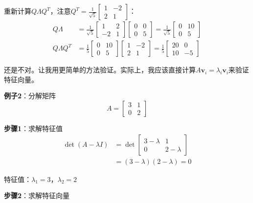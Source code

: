\documentclass[12pt,a4paper]{article}
\begin{document}
重新计算$Q\Lambda Q^T$，注意$Q^T = \frac{1}{\sqrt{5}} \begin{bmatrix} 1 & -2 \\ 2 & 1 \end{bmatrix}$：
\begin{align}
Q\Lambda &= \frac{1}{\sqrt{5}} \begin{bmatrix} 1 & 2 \\ -2 & 1 \end{bmatrix} \begin{bmatrix} 0 & 0 \\ 0 & 5 \end{bmatrix} = \frac{1}{\sqrt{5}} \begin{bmatrix} 0 & 10 \\ 0 & 5 \end{bmatrix} \\
Q\Lambda Q^T &= \frac{1}{5} \begin{bmatrix} 0 & 10 \\ 0 & 5 \end{bmatrix} \begin{bmatrix} 1 & -2 \\ 2 & 1 \end{bmatrix} = \frac{1}{5} \begin{bmatrix} 20 & 0 \\ 10 & -5 \end{bmatrix}
\end{align}

还是不对。让我用更简单的方法验证。实际上，我应该直接计算$A\bm{v}_i = \lambda_i \bm{v}_i$来验证特征向量。

\textbf{例子2}：分解矩阵
\begin{equation}
A = \begin{bmatrix} 3 & 1 \\ 0 & 2 \end{bmatrix}
\end{equation}

\textbf{步骤1}：求解特征值
\begin{align}
\det(A - \lambda I) &= \det\begin{bmatrix} 3-\lambda & 1 \\ 0 & 2-\lambda \end{bmatrix} \\
&= (3-\lambda)(2-\lambda) = 0
\end{align}

特征值：$\lambda_1 = 3$，$\lambda_2 = 2$

\textbf{步骤2}：求解特征向量
\end{document}
